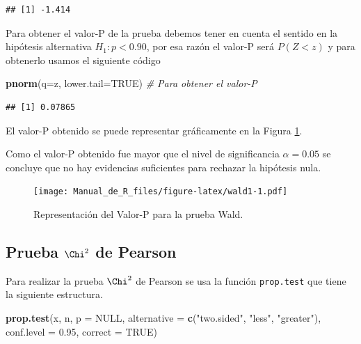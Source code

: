 \documentclass[10pt,]{krantz}
\makeatletter
\newenvironment{Shaded}{\begin{snugshade}}{\end{snugshade}}
\newcommand{\KeywordTok}[1]{\textcolor[rgb]{0.13,0.29,0.53}{\textbf{#1}}}
\newcommand{\DataTypeTok}[1]{\textcolor[rgb]{0.13,0.29,0.53}{#1}}
\newcommand{\FloatTok}[1]{\textcolor[rgb]{0.00,0.00,0.81}{#1}}
\newcommand{\StringTok}[1]{\textcolor[rgb]{0.31,0.60,0.02}{#1}}
\newcommand{\CommentTok}[1]{\textcolor[rgb]{0.56,0.35,0.01}{\textit{#1}}}
\newcommand{\OtherTok}[1]{\textcolor[rgb]{0.56,0.35,0.01}{#1}}
\newcommand{\NormalTok}[1]{#1}
\newenvironment{kframe}{%
\medskip{}
\setlength{\fboxsep}{.8em}
 \def\at@end@of@kframe{}%
 \ifinner\ifhmode%
  \def\at@end@of@kframe{\end{minipage}}%
  \begin{minipage}{\columnwidth}%
 \fi\fi%
 \def\FrameCommand##1{\hskip\@totalleftmargin \hskip-\fboxsep
 \colorbox{shadecolor}{##1}\hskip-\fboxsep
     \hskip-\linewidth \hskip-\@totalleftmargin \hskip\columnwidth}%
 \MakeFramed {\advance\hsize-\width
   \@totalleftmargin\z@ \linewidth\hsize
   \@setminipage}}%
 {\par\unskip\endMakeFramed%
 \at@end@of@kframe}
\renewenvironment{Shaded}{\begin{kframe}}{\end{kframe}}
\makeatother
\begin{document}
\begin{verbatim}
## [1] -1.414
\end{verbatim}

Para obtener el valor-P de la prueba debemos tener en cuenta el sentido
en la hipótesis alternativa \(H_1: p < 0.90\), por esa razón el valor-P
será \(P(Z<z)\) y para obtenerlo usamos el siguiente código

\begin{Shaded}
\begin{Highlighting}[]
\KeywordTok{pnorm}\NormalTok{(}\DataTypeTok{q=}\NormalTok{z, }\DataTypeTok{lower.tail=}\OtherTok{TRUE}\NormalTok{)  }\CommentTok{# Para obtener el valor-P}
\end{Highlighting}
\end{Shaded}

\begin{verbatim}
## [1] 0.07865
\end{verbatim}

El valor-P obtenido se puede representar gráficamente en la Figura
\ref{fig:wald1}.

Como el valor-P obtenido fue mayor que el nivel de significancia
\(\alpha=0.05\) se concluye que no hay evidencias suficientes para
rechazar la hipótesis nula.

\begin{figure}
\centering
\texttt{[image: Manual\_de\_R\_files/figure-latex/wald1-1.pdf]}
\caption{\label{fig:wald1}Representación del Valor-P para la prueba Wald.}
\end{figure}

\newpage

\subsection{\texorpdfstring{Prueba \(\Chi^2\) de
Pearson}{Prueba \textbackslash{}Chi\^{}2 de Pearson}}\label{prueba-chi2-de-pearson}

Para realizar la prueba \(\Chi^2\) de Pearson se usa la función
\texttt{prop.test} que tiene la siguiente estructura.

\begin{Shaded}
\begin{Highlighting}[]
\KeywordTok{prop.test}\NormalTok{(x, n, }\DataTypeTok{p =} \OtherTok{NULL}\NormalTok{,}
          \DataTypeTok{alternative =} \KeywordTok{c}\NormalTok{(}\StringTok{"two.sided"}\NormalTok{, }\StringTok{"less"}\NormalTok{, }\StringTok{"greater"}\NormalTok{),}
          \DataTypeTok{conf.level =} \FloatTok{0.95}\NormalTok{, }\DataTypeTok{correct =} \OtherTok{TRUE}\NormalTok{)}
\end{Highlighting}
\end{Shaded}
\end{document}
